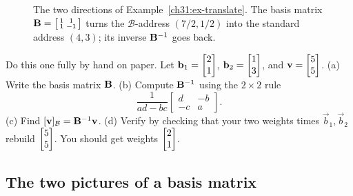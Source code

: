 \begin{figure}[htbp]
\centering
{}
\caption{The two directions of Example~\ref{ch31:ex-translate}. The basis matrix
$\mathbf{B}=\protect\begin{bsmallmatrix}1&1\\1&-1\protect\end{bsmallmatrix}$ turns the
$\mathcal{B}$-address $(7/2,1/2)$ into the standard address $(4,3)$; its
inverse $\mathbf{B}^{-1}$ goes back.}
\label{ch31:fig-encode-decode}
\end{figure}

\begin{labbox}
Do this one fully by hand on paper. Let
$\mathbf{b}_1=\begin{bmatrix}2\\1\end{bmatrix}$, $\mathbf{b}_2=\begin{bmatrix}1\\3\end{bmatrix}$, and $\mathbf{v}=\begin{bmatrix}5\\5\end{bmatrix}$.
(a) Write the basis matrix $\mathbf{B}$. (b) Compute $\mathbf{B}^{-1}$ using the
$2\times2$ rule
\[
  \frac{1}{ad-bc}\begin{bmatrix} d & -b\\ -c & a\end{bmatrix}.
\]
(c) Find $[\mathbf{v}]_{\mathcal{B}}=\mathbf{B}^{-1}\mathbf{v}$. (d) Verify by checking that
your two weights times $\vec{b}_1,\vec{b}_2$ rebuild $\begin{bmatrix}5\\5\end{bmatrix}$. You should
get weights $\begin{bmatrix}2\\1\end{bmatrix}$.
\end{labbox}

\subsection{The two pictures of a basis matrix}
\label{ch31:two-pictures}

